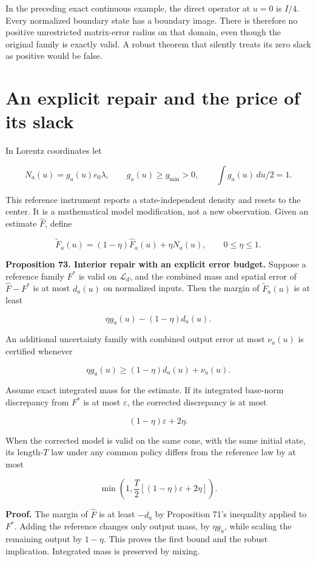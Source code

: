 In the preceding exact continuous example, the direct operator at
\(u=0\) is \(I/4\). Every normalized boundary state has a boundary
image. There is therefore no positive unrestricted matrix-error radius
on that domain, even though the original family is exactly valid. A
robust theorem that silently treats its zero slack as positive would be
false.

\section{An explicit repair and the price of its slack}\label{LSM:an-explicit-repair-and-the-price-of-its-slack}

In Lorentz coordinates let

\[
N_a(u)=g_a(u)e_0\lambda,\qquad
 g_a(u)\geq g_{\min}>0,\qquad \int g_a(u)\,du/2=1.
\]

This reference instrument reports a state-independent density and resets
to the center. It is a mathematical model modification, not a new
observation. Given an estimate \(\widehat F\), define

\[
\widetilde F_a(u)=(1-\eta)\widehat F_a(u)+\eta N_a(u),
\qquad 0\leq\eta\leq1.
\]

\textbf{Proposition 73. Interior repair with an explicit error budget.}
Suppose a reference family \(F^*\) is valid on \(\mathcal L_d\), and the
combined mass and spatial error of \(\widehat F-F^*\) is at most
\(d_a(u)\) on normalized inputs. Then the margin of
\(\widetilde F_a(u)\) is at least

\[
\boxed{\eta g_a(u)-(1-\eta)d_a(u).}
\]

An additional uncertainty family with combined output error at most
\(\nu_a(u)\) is certified whenever

\[
\eta g_a(u)\geq(1-\eta)d_a(u)+\nu_a(u).
\]

Assume exact integrated mass for the estimate. If its integrated
base-norm discrepancy from \(F^*\) is at most \(\varepsilon\), the
corrected discrepancy is at most

\[
\boxed{(1-\eta)\varepsilon+2\eta.}
\]

When the corrected model is valid on the same cone, with the same
initial state, its length-\(T\) law under any common policy differs from
the reference law by at most

\[
\min\left(1,\frac T2[(1-\eta)\varepsilon+2\eta]\right).
\]

\textbf{Proof.} The margin of \(\widehat F\) is at least \(-d_a\) by
Proposition 71's inequality applied to \(F^*\). Adding the reference
changes only output mass, by \(\eta g_a\), while scaling the remaining
output by \(1-\eta\). This proves the first bound and the robust
implication. Integrated mass is preserved by mixing.

